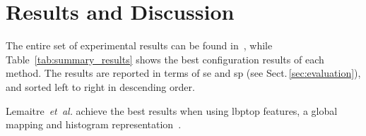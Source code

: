 \section{Results and Discussion}\label{sec:results}\label{sec:discussion}

The entire set of experimental results can be found in~\cite{rethinopaty20016apr-repoICPR}, while Table~\ref{tab:summary_results} shows the best configuration results of each method.
The results are reported in terms of \gls{se} and \gls{sp} (see Sect.\,\ref{sec:evaluation}), and sorted left to right in descending order.

Lemaitre~\emph{et~al.} achieve the best results when using \gls{lbptop} features, a global mapping and histogram representation~\cite{Lemaintre2015miccaiOCT}.


